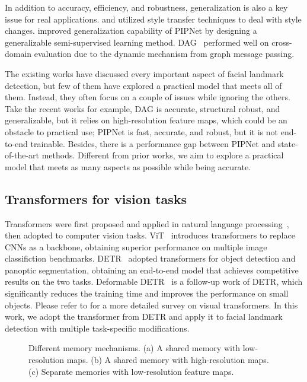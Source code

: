 \documentclass{article}
\begin{document}
In addition to accuracy, efficiency, and robustness, generalization is also a key issue for real applications. \citet{DYO18} and \citet{QSW19} utilized style transfer techniques to deal with style changes. \citet{JLS20} improved generalization capability of PIPNet by designing a generalizable semi-supervised learning method. DAG~\citep{LLZ20} performed well on cross-domain evaluation due to the dynamic mechanism from graph message passing. 

The existing works have discussed every important aspect of facial landmark detection, but few of them have explored a practical model that meets all of them. Instead, they often focus on a couple of issues while ignoring the others. Take the recent works for example, DAG is accurate, structural robust, and generalizable, but it relies on high-resolution feature maps, which could be an obstacle to practical use; PIPNet is fast, accurate, and robust, but it is not end-to-end trainable. Besides, there is a performance gap between PIPNet and state-of-the-art methods. Different from prior works, we aim to explore a practical model that meets as many aspects as possible while being accurate. 

\subsection{Transformers for vision tasks}

Transformers were first proposed and applied in natural language processing~\citep{VSP17}, then adopted to computer vision tasks. ViT~\citep{DBK21} introduces transformers to replace CNNs as a backbone, obtaining superior performance on multiple image classifiction benchmarks. DETR~\citep{CMS20} adopted transformers for object detection and panoptic segmentation, obtaining an end-to-end model that achieves competitive results on the two tasks. Deformable DETR~\citep{ZSL21} is a follow-up work of DETR, which significantly reduces the training time and improves the performance on small objects. Please refer to \citep{KNH21} for a more detailed survey on visual transformers. In this work, we adopt the transformer from DETR and apply it to facial landmark detection with multiple task-specific modifications.  

\begin{figure}
\centering
    \vspace{-3mm}
    \caption{Different memory mechanisms. (a) A shared memory with low-resolution maps. (b) A shared memory with high-resolution maps. (c) Separate memories with low-resolution feature maps.}
    \label{fig:QAMem}
\end{figure}
\end{document}
